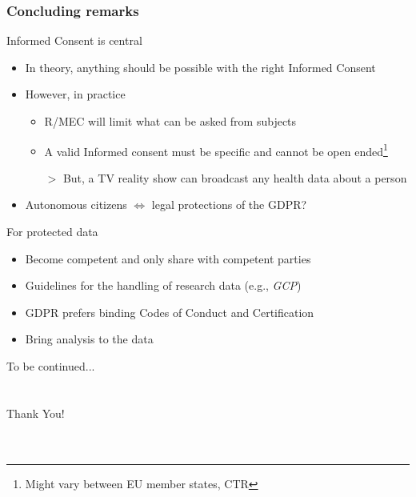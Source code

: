\documentclass[xcolor=dvipsnames]{beamer}
\begin{document}
\begin{frame}
	\frametitle{Concluding remarks}
	
	\begin{block}{Informed Consent is central}
	\begin{itemize}
	\item In theory, anything should be possible with the right Informed Consent
	\item However, in practice
		\begin{itemize}
		\item R/MEC will limit what can be asked from subjects
		\item A valid Informed consent must be specific and cannot be open ended\footnote[frame]{Might vary between EU member states, CTR}
		\item [$>$]{\color{Maroon} But, a TV reality show can broadcast any health data about a person}
		\end{itemize}
	\item Autonomous citizens $\Leftrightarrow$ legal protections of the GDPR?
	\end{itemize}
	\end{block}
	
	\begin{block}{For protected data}
	\begin{itemize}
	\item Become competent and only share with competent parties
	\item Guidelines for the handling of research data (e.g., {\em GCP})
	\item GDPR prefers binding Codes of Conduct and Certification
	\item Bring analysis to the data
	\end{itemize}
	\end{block}

\end{frame}

\begin{frame}
	\begin{center}
	To be continued...\\
	~\\~\\
	{\Huge Thank You!}\\
	~\\~\\
	\end{center}
\end{frame}
\end{document}
